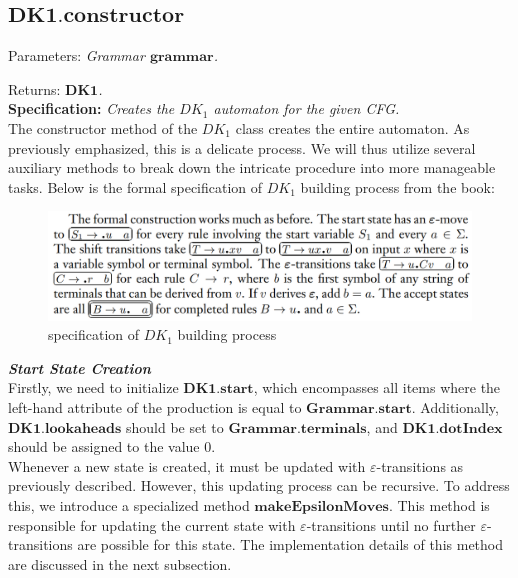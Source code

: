\vspace{10pt}

\subsection{\(\boldsymbol{DK1.constructor}\)}

Parameters: \textit{Grammar \(\boldsymbol{grammar}\).}

Returns: \textit{\(\boldsymbol{DK1}\).}\\

\textbf{Specification:} \textit{Creates the \(DK_{1}\) automaton for the given CFG.}\\

The constructor method of the \(DK_{1}\) class creates the entire automaton. As previously emphasized, this is a delicate process. We will thus utilize several auxiliary methods to break down the intricate procedure into more manageable tasks. Below is the formal specification of \(DK_{1}\) building process from the book:\\


\begin{figure}[h!]
    \includegraphics[width=\linewidth]{DK1 formal specification.png}
    \caption{specification of \(DK_{1}\) building process}
    \label{3}
\end{figure}

\vspace{15pt}

\textbf{\textit{Start State Creation}}\\

Firstly, we need to initialize \(\boldsymbol{DK1.start}\), which encompasses all items where the left-hand attribute of the production is equal to \(\boldsymbol{Grammar.start}\). Additionally, \(\boldsymbol{DK1.lookaheads}\) should be set to \(\boldsymbol{Grammar.terminals}\), and \(\boldsymbol{DK1.dotIndex}\) should be assigned to the value 0.\\

Whenever a new state is created, it must be updated with \(\varepsilon\)-transitions as previously described. However, this updating process can be recursive. To address this, we introduce a specialized method \(\boldsymbol{makeEpsilonMoves}\). This method is responsible for updating the current state with \(\varepsilon\)-transitions until no further \(\varepsilon\)-transitions are possible for this state. The implementation details of this method are discussed in the next subsection.\\

